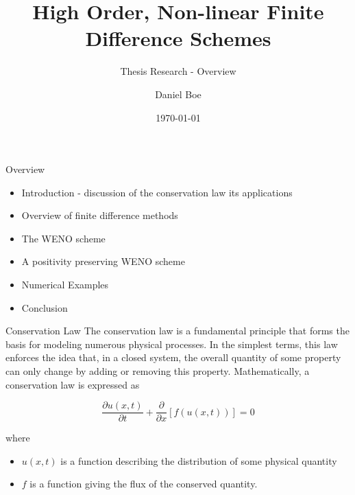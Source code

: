 \documentclass[9pt]{beamer}
\title{High Order, Non-linear Finite Difference Schemes}
\subtitle{Thesis Research - Overview}
\date{\today}
\author{Daniel Boe}
\institute{South Dakota School of Mines and Technology}
\begin{document}
\maketitle

\begin{frame}{Overview}
  \begin{itemize}
  \item Introduction - discussion of the conservation law its applications
  \item Overview of finite difference methods
  \item The WENO scheme
  \item A positivity preserving WENO scheme 
  \item Numerical Examples
  \item Conclusion
  \end{itemize}
  \end{frame}

\begin{frame}{Conservation Law}
  The conservation law is a fundamental principle that forms the basis for modeling numerous physical processes.  In the simplest terms, this law enforces the idea that, in a closed system, the overall quantity of some property can only change by adding or removing this property.  Mathematically, a conservation law is expressed as
  
  \begin{equation}
    \frac{\partial u(x,t)}{\partial t} + \frac{\partial}{\partial x}[f(u(x,t))]=0\label{eq:Conservation Law}
  \end{equation}
  
  where 
  \begin{itemize}
    \item $u(x,t)$ is a function describing the distribution of some physical quantity 
    \item $f$ is a function giving the flux of the conserved quantity.
  \end{itemize}

\end{frame}
\end{document}
